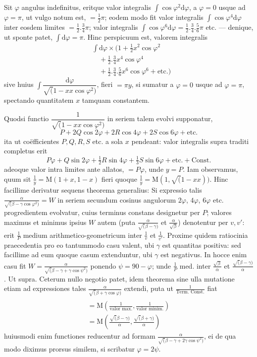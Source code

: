 Sit \(\varphi\) angulus indefinitus, eritque valor integralis
\(\int\cos\varphi^2\mathrm{d}\varphi\), a \(\varphi=0\) usque ad
\(\varphi=\pi\), ut vulgo notum est, \(=\tfrac12\pi\); eodem modo fit
valor integralis \(\int\cos\varphi^4\mathrm{d}\varphi\) inter eosdem limites
\(=\tfrac12.\tfrac34\pi\); valor integralis
\(\int\cos\varphi^6\mathrm{d}\varphi=\tfrac12.\tfrac34.\tfrac56\pi\)
etc. --- denique, ut sponte patet, \(\int\mathrm{d}\varphi=\pi\).
Hinc perspicuum est, valorem integralis
\[
\begin{aligned}&\int\mathrm{d}\varphi\times
\bigl(1+\tfrac12x^2\cos\varphi^2\\&\quad+\tfrac12.\tfrac34x^4\cos\varphi^4\\&\quad+\tfrac12.\tfrac34.\tfrac56x^6\cos\varphi^6+\text{etc.}\bigr)\end{aligned}
\]
sive huius \(\int\dfrac{\mathrm{d}\varphi}{\surd(1-xx\cos\varphi^2)}\),
fieri \(=\pi y\), si sumatur a \(\varphi=0\) usque ad \(\varphi=\pi\),
spectando quantitatem \(x\) tamquam constantem.

Quodsi functio \(\dfrac1{\surd(1-xx\cos\varphi^2)}\) in seriem talem
evolvi supponatur,
\[
P+2Q\cos2\varphi+2R\cos4\varphi+2S\cos6\varphi+\text{etc.}
\]
ita ut co\"efficientes \(P,Q,R,S\) etc. a sola \(x\) pendeant: valor
integralis supra traditi completus erit
\[
P\varphi+Q\sin2\varphi+\tfrac12R\sin4\varphi+\tfrac13S\sin6\varphi
+\text{etc.}+\text{Const.}
\]
adeoque valor intra limites ante allatos, $=P\varphi$, unde $y=P$. Iam observamus,
quum sit $\frac{1}{y}=\mathrm{M}(1+x,1-x)$ fieri quoque
$\frac{1}{y}=\mathrm{M}(1,\surd(1-xx))$. Hinc facillime derivatur sequens
theorema generalius: Si expressio talis
$\frac{\alpha}{\surd(\beta-\gamma\cos\varphi^{2})}=W$
in seriem secundum cosinus angulorum $2\varphi$, $4\varphi$, $6\varphi$ etc.
progredientem evolvatur, cuius terminus constans designetur per $P$; valores maximus
et minimus ipsius $W$ autem (puta $\frac{\alpha}{\surd(\beta-\gamma)}$ et
$\frac{\alpha}{\surd\beta}$) denotentur per $v,v'$: erit $\frac{1}{P}$ medium arithmetico-geometricum inter $\frac{1}{v}$ et $\frac{1}{v'}$. Proxime quidem
ratiocinia praecedentia pro eo tantummodo casu valent, ubi $\gamma$ est quantitas
positiva: sed facillime ad eum quoque casum extenduntur, ubi $\gamma$ est negativus.
In hocce enim casu fit $W=\frac{\alpha}{\surd(\beta-\gamma+\gamma\cos\psi^{2})}$
ponendo $\psi=90-\varphi$; unde $\frac{1}{P}$ med. inter
$\frac{\surd\beta}{\alpha}$ et $\frac{\surd(\beta-\gamma)}{\alpha}$. Ut supra.
Ceterum nullo negotio patet, idem theorema sine ulla mutatione etiam ad expressiones tales $\frac{\alpha}{\surd(\beta+\gamma\cos\varphi)}$ extendi, puta ut
$\frac{1}{\text{Term. Const.}}$ fiat
\[
\begin{gathered}\\=\mathrm{M}\left(\frac{1}{\text{valor max.}},\frac{1}{\text{valor minim.}}\right)\\=\mathrm{M}\left(\frac{\surd(\beta-\gamma)}{\alpha},
                 \frac{\surd(\beta+\gamma)}{\alpha}\right)\end{gathered}
\]
huiusmodi enim functiones reducentur ad formam
$\frac{\alpha}{\surd(\beta-\gamma+2\gamma\cos\psi^{2})}$, ei de qua modo diximus
prorsus similem, si scribatur $\varphi=2\psi$.

